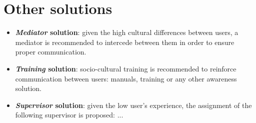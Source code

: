 \section{Other solutions}

\begin{itemize}

\item \textbf{\emph{Mediator} solution}: given the high cultural differences between users, a mediator is recommended to intercede between them in order to ensure proper communication.\newline

\item \textbf{\emph{Training} solution}: socio-cultural training is recommended to reinforce communication between users: manuals, training or any other awareness solution.\newline

\item \textbf{\emph{Supervisor} solution}: given the low user's experience, the assignment of the following supervisor is proposed: ...\newline

\end{itemize}